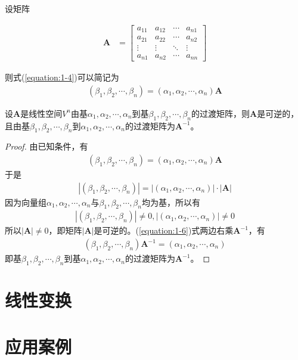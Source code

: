 设矩阵

\begin{eqnarray}
    \textbf{A}&=\left[\begin{array}{cccc}
        a_{11}&a_{12}&\cdots&a_{n1}\\
        a_{21}&a_{22}&\cdots&a_{n2}\\
        \vdots&\vdots&\ddots&\vdots\\
        a_{n1}&a_{n2}&\cdots&a_{nn}
    \end{array}\right]
\end{eqnarray}

则式(\ref{equation:1-4})可以简记为
\begin{eqnarray}
    \left(\beta_{1},\beta_{2},\cdots,\beta_{n}\right)=\left(\alpha_{1},\alpha_{2},\cdots,\alpha_{n}\right)\mathbf{A}\label{equation:1-6}
\end{eqnarray}

\begin{theorem}
    设$\mathbf{A}$是线性空间$V^{n}$由基$\alpha_{1},\alpha_{2},\cdots,\alpha_{n}$到基$\beta_{1},\beta_{2},\cdots,\beta_{n}$的过渡矩阵，则$\mathbf{A}$是可逆的，且由基$\beta_{1},\beta_{2},\cdots,\beta_{n}$到$\alpha_{1},\alpha_{2},\cdots,\alpha_{n}$的过渡矩阵为$\mathbf{A}^{-1}$。
\end{theorem}

\begin{proof}
    由已知条件，有
    \begin{eqnarray}
        \left(\beta_{1},\beta_{2},\cdots,\beta_{n}\right)=\left(\alpha_{1},\alpha_{2},\cdots,\alpha_{n}\right)\mathbf{A}\nonumber
    \end{eqnarray}
    于是
    \begin{eqnarray}
        \left|\left(\beta_{1},\beta_{2},\cdots,\beta_{n}\right)\right|=\left|\left(\alpha_{1},\alpha_{2},\cdots,\alpha_{n}\right)\right|\cdot\left|\mathbf{A}\right|\nonumber
    \end{eqnarray}
    因为向量组$\alpha_{1},\alpha_{2},\cdots,\alpha_{n}$与$\beta_{1},\beta_{2},\cdots,\beta_{n}$均为基，所以有
    \begin{eqnarray}
        \left|\left(\beta_{1},\beta_{2},\cdots,\beta_{n}\right)\right|\neq{0},\left|\left(\alpha_{1},\alpha_{2},\cdots,\alpha_{n}\right)\right|\neq{0}\nonumber
    \end{eqnarray}
    所以$\left|\mathbf{A}\right|\neq{0}$，即矩阵$\left|\mathbf{A}\right|$是可逆的。(\ref{equation:1-6})式两边右乘$\mathbf{A}^{-1}$，有
    \begin{eqnarray}
        \left(\beta_{1},\beta_{2},\cdots,\beta_{n}\right)\mathbf{A}^{-1}=\left(\alpha_{1},\alpha_{2},\cdots,\alpha_{n}\right)
    \end{eqnarray}
    即基$\beta_{1},\beta_{2},\cdots,\beta_{n}$到基$\alpha_{1},\alpha_{2},\cdots,\alpha_{n}$的过渡矩阵为$\mathbf{A}^{-1}$。
\end{proof}

\section{线性变换}
\section{应用案例}
